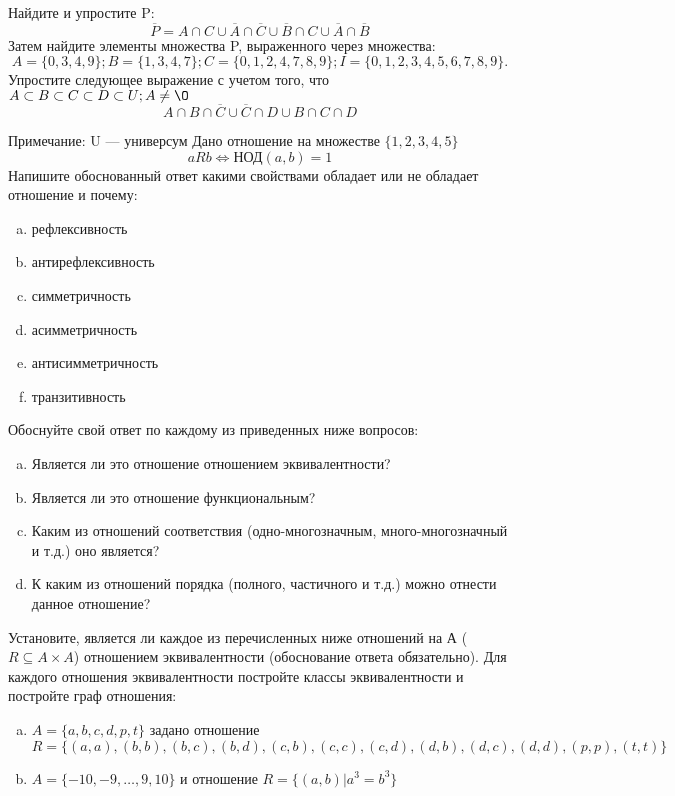 \documentclass[10pt]{exam}
\begin{document}
\begin{questions}
\question
Найдите и упростите P:
\begin{equation*}
\overline{P} = A \cap C \cup \overline{A} \cap \overline{C} \cup \overline{B} \cap C \cup \overline{A} \cap \overline{B}
\end{equation*}
Затем найдите элементы множества P, выраженного через множества:
\begin{equation*}
A = \{0, 3, 4, 9\}; 
B = \{1, 3, 4, 7\};
C = \{0, 1, 2, 4, 7, 8, 9\};
I = \{0, 1, 2, 3, 4, 5, 6, 7, 8, 9\}.
\end{equation*}\question
Упростите следующее выражение с учетом того, что $A\subset B \subset C \subset D \subset U; A \neq \O$
\begin{equation*}
A \cap B  \cap \overline{C} \cup \overline{C} \cap D \cup B \cap C \cap D
\end{equation*}

Примечание: U — универсум\question
Дано отношение на множестве $\{1, 2, 3, 4, 5\}$ 
\begin{equation*}
aRb \iff  \text{НОД}(a,b) =1
\end{equation*}
Напишите обоснованный ответ какими свойствами обладает или не обладает отношение и почему:   
\begin{enumerate} [a)]\setcounter{enumi}{0}
\item рефлексивность
\item антирефлексивность
\item симметричность
\item асимметричность
\item антисимметричность
\item транзитивность
\end{enumerate}

Обоснуйте свой ответ по каждому из приведенных ниже вопросов:
\begin{enumerate} [a)]\setcounter{enumi}{0}
    \item Является ли это отношение отношением эквивалентности?
    \item Является ли это отношение функциональным?
    \item Каким из отношений соответствия (одно-многозначным, много-многозначный и т.д.) оно является?
    \item К каким из отношений порядка (полного, частичного и т.д.) можно отнести данное отношение?
\end{enumerate}


\question
Установите, является ли каждое из перечисленных ниже отношений на А ($R \subseteq A \times A$) отношением эквивалентности (обоснование ответа обязательно). Для каждого отношения эквивалентности постройте классы 
эквивалентности и постройте граф отношения:
\begin{enumerate} [a)]\setcounter{enumi}{0}
\item $A = \{a, b, c, d, p, t\}$ задано отношение $R = \{(a, a), (b, b), (b, c), (b, d), (c, b), (c, c), (c, d), (d, b), (d, c), (d, d), (p,p), (t,t)\}$
\item $A = \{-10, -9, … , 9, 10\}$ и отношение $R = \{(a,b)|a^{3} = b^{3}\}$


\end{enumerate}
\end{questions}
\end{document}
